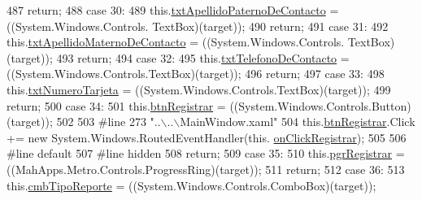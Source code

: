 \begin{DoxyCode}
487             \textcolor{keywordflow}{return};
488             \textcolor{keywordflow}{case} 30:
489             this.\hyperlink{class_proyecto___integrador__3_1_1_main_window_ad353fe2247d841495434638ca24cf97c}{txtApellidoPaternoDeContacto} = ((System.Windows.Controls.
      TextBox)(target));
490             \textcolor{keywordflow}{return};
491             \textcolor{keywordflow}{case} 31:
492             this.\hyperlink{class_proyecto___integrador__3_1_1_main_window_a3fc9dd11451712b3345df9f7a471d9b7}{txtApellidoMaternoDeContacto} = ((System.Windows.Controls.
      TextBox)(target));
493             \textcolor{keywordflow}{return};
494             \textcolor{keywordflow}{case} 32:
495             this.\hyperlink{class_proyecto___integrador__3_1_1_main_window_a0103b8eb21ee11204623d0f08a6acdaf}{txtTelefonoDeContacto} = ((System.Windows.Controls.TextBox)(target));
496             \textcolor{keywordflow}{return};
497             \textcolor{keywordflow}{case} 33:
498             this.\hyperlink{class_proyecto___integrador__3_1_1_main_window_aa002c65e1d03d58932cae92c7523198a}{txtNumeroTarjeta} = ((System.Windows.Controls.TextBox)(target));
499             \textcolor{keywordflow}{return};
500             \textcolor{keywordflow}{case} 34:
501             this.\hyperlink{class_proyecto___integrador__3_1_1_main_window_ac1b64fa55a6742a8f529987bfd452c80}{btnRegistrar} = ((System.Windows.Controls.Button)(target));
502             
503 \textcolor{preprocessor}{            #line 273 "..\(\backslash\)..\(\backslash\)MainWindow.xaml"}
504 \textcolor{preprocessor}{}            this.\hyperlink{class_proyecto___integrador__3_1_1_main_window_ac1b64fa55a6742a8f529987bfd452c80}{btnRegistrar}.Click += \textcolor{keyword}{new} System.Windows.RoutedEventHandler(this.
      \hyperlink{class_proyecto___integrador__3_1_1_main_window_a39bbc99ea9b8992b13d0fca168a7c114}{onClickRegistrar});
505             
506 \textcolor{preprocessor}{            #line default}
507 \textcolor{preprocessor}{}\textcolor{preprocessor}{            #line hidden}
508 \textcolor{preprocessor}{}            \textcolor{keywordflow}{return};
509             \textcolor{keywordflow}{case} 35:
510             this.\hyperlink{class_proyecto___integrador__3_1_1_main_window_a3013e3941492422c2fb9151f99f5d3ef}{pgrRegistrar} = ((MahApps.Metro.Controls.ProgressRing)(target));
511             \textcolor{keywordflow}{return};
512             \textcolor{keywordflow}{case} 36:
513             this.\hyperlink{class_proyecto___integrador__3_1_1_main_window_af005273fce43d170b199a3f487ab24cf}{cmbTipoReporte} = ((System.Windows.Controls.ComboBox)(target));

\end{DoxyCode}
